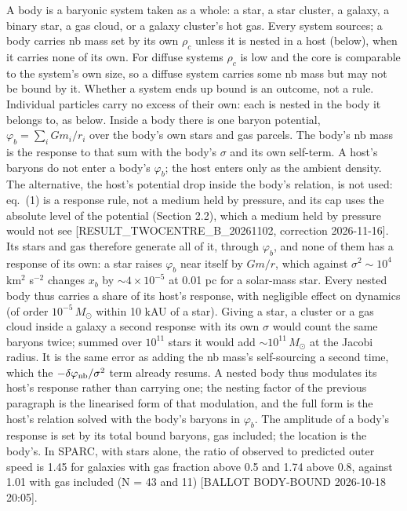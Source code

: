 \documentclass[
  10pt,
]{article}
\begin{document}
A body is a baryonic system taken as a whole: a star, a star cluster, a galaxy, a binary star, a gas cloud, or a galaxy cluster's hot gas. Every system sources; a body carries nb mass set by its own $\rho_c$ unless it is nested in a host (below), when it carries none of its own. For diffuse systems $\rho_c$ is low and the core is comparable to the system's own size, so a diffuse system carries some nb mass but may not be bound by it. Whether a system ends up bound is an outcome, not a rule. Individual particles carry no excess of their own: each is nested in the body it belongs to, as below. Inside a body there is one baryon potential, $\varphi_b=\sum_i Gm_i/r_i$ over the body's own stars and gas parcels. The body's nb mass is the response to that sum with the body's $\sigma$ and its own self-term. A host's baryons do not enter a body's $\varphi_b$; the host enters only as the ambient density. The alternative, the host's potential drop inside the body's relation, is not used: eq.~(1) is a response rule, not a medium held by pressure, and its cap uses the absolute level of the potential (Section 2.2), which a medium held by pressure would not see {[}RESULT\_TWOCENTRE\_B\_20261102, correction 2026-11-16{]}. Its stars and gas therefore generate all of it, through $\varphi_b$, and none of them has a response of its own: a star raises $\varphi_b$ near itself by $Gm/r$, which against $\sigma^2\sim10^4$ km$^2$ s$^{-2}$ changes $x_b$ by $\sim4\times10^{-5}$ at 0.01 pc for a solar-mass star. Every nested body thus carries a share of its host's response, with negligible effect on dynamics (of order $10^{-5}\,M_\odot$ within 10 kAU of a star). Giving a star, a cluster or a gas cloud inside a galaxy a second response with its own $\sigma$ would count the same baryons twice; summed over $10^{11}$ stars it would add $\sim10^{11}\,M_\odot$ at the Jacobi radius. It is the same error as adding the nb mass's self-sourcing a second time, which the $-\delta\varphi_{\rm nb}/\sigma^2$ term already resums. A nested body thus modulates its host's response rather than carrying one; the nesting factor of the previous paragraph is the linearised form of that modulation, and the full form is the host's relation solved with the body's baryons in $\varphi_b$. The amplitude of a body's response is set by its total bound baryons, gas included; the location is the body's. In SPARC, with stars alone, the ratio of observed to predicted outer speed is 1.45 for galaxies with gas fraction above 0.5 and 1.74 above 0.8, against 1.01 with gas included (N = 43 and 11) {[}BALLOT BODY-BOUND 2026-10-18 20:05{]}.
\end{document}
